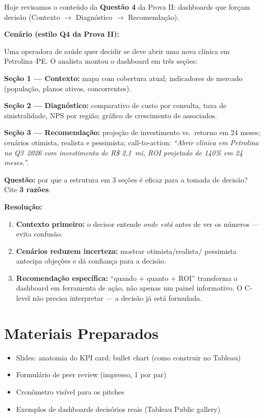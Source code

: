 \begin{NoteBox}
Hoje revisamos o conteúdo da \textbf{Questão 4} da Prova II:
dashboards que forçam decisão (Contexto $\to$ Diagnóstico $\to$ Recomendação).
\end{NoteBox}

\begin{SolvedBox}
\textbf{Cenário (estilo Q4 da Prova II):}

Uma operadora de saúde quer decidir se deve abrir uma nova clínica em
Petrolina--PE. O analista montou o dashboard em três seções:

\textbf{Seção 1 — Contexto:} mapa com cobertura atual; indicadores de
mercado (população, planos ativos, concorrentes).

\textbf{Seção 2 — Diagnóstico:} comparativo de custo por consulta, taxa
de sinistralidade, NPS por região; gráfico de crescimento de associados.

\textbf{Seção 3 — Recomendação:} projeção de investimento vs.\ retorno
em 24 meses; cenários otimista, realista e pessimista; call-to-action:
\textit{``Abrir clínica em Petrolina no Q3~2026 com investimento de
R\$ 2,1~mi, ROI projetado de 140\% em 24 meses.''}.

\textbf{Questão:} por que a estrutura em 3 seções é eficaz para a tomada
de decisão? Cite \textbf{3 razões}.

\textbf{Resolução:}
\begin{enumerate}
  \item \textbf{Contexto primeiro:} o decisor entende \emph{onde está} antes
  de ver os números — evita confusão.
  \item \textbf{Cenários reduzem incerteza:} mostrar otimista/realista/
  pessimista antecipa objeções e dá confiança para a decisão.
  \item \textbf{Recomendação específica:} ``quando + quanto + ROI'' transforma
  o dashboard em ferramenta de ação, não apenas um painel informativo.
  O C-level não precisa interpretar — a decisão já está formulada.
\end{enumerate}
\end{SolvedBox}

\section{Materiais Preparados}
\begin{itemize}
  \item Slides: anatomia do KPI card; bullet chart (como construir no Tableau)
  \item Formulário de peer review (impresso, 1 por par)
  \item Cronômetro visível para os pitches
  \item Exemplos de dashboards decisórios reais (Tableau Public gallery)
\end{itemize}

